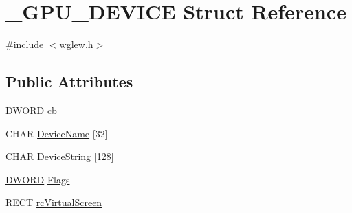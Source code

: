 \hypertarget{struct___g_p_u___d_e_v_i_c_e}{\section{\-\_\-\-G\-P\-U\-\_\-\-D\-E\-V\-I\-C\-E Struct Reference}
\label{struct___g_p_u___d_e_v_i_c_e}
}


{\ttfamily \#include $<$wglew.\-h$>$}

\subsection*{Public Attributes}
\begin{DoxyCompactItemize}
\item 
\hyperlink{_free_image_8h_af483253b2143078cede883fc3c111ad2}{D\-W\-O\-R\-D} \hyperlink{struct___g_p_u___d_e_v_i_c_e_afcb22f16ba9e526610489ff56ab78ddb}{cb}
\item 
C\-H\-A\-R \hyperlink{struct___g_p_u___d_e_v_i_c_e_a604bfab61f1a2c5d1e635837d369ba14}{Device\-Name} \mbox{[}32\mbox{]}
\item 
C\-H\-A\-R \hyperlink{struct___g_p_u___d_e_v_i_c_e_aff8b7920ccc85afcd6f325da6cdb0b73}{Device\-String} \mbox{[}128\mbox{]}
\item 
\hyperlink{_free_image_8h_af483253b2143078cede883fc3c111ad2}{D\-W\-O\-R\-D} \hyperlink{struct___g_p_u___d_e_v_i_c_e_a008db9d0f5fc13a5160805f40465f14a}{Flags}
\item 
R\-E\-C\-T \hyperlink{struct___g_p_u___d_e_v_i_c_e_aeb573bbeb3b6c589246720ef259b9a27}{rc\-Virtual\-Screen}
\end{DoxyCompactItemize}


